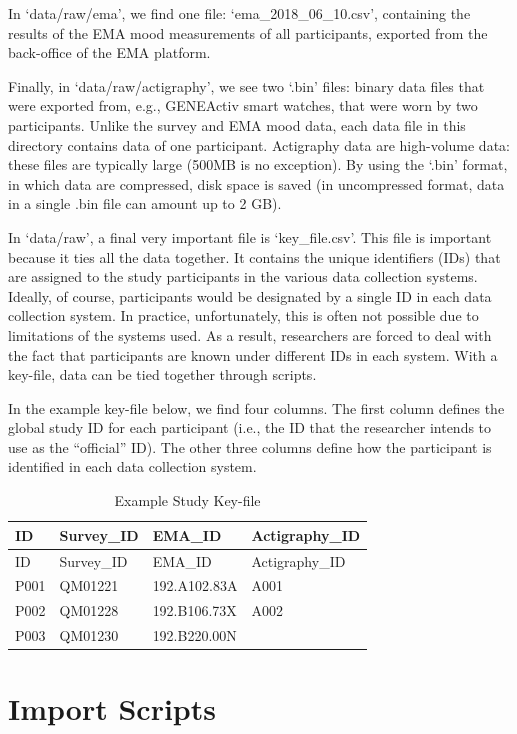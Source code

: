 \documentclass[]{book}
\begin{document}
In `data/raw/ema', we find one file: `ema\_2018\_06\_10.csv', containing
the results of the EMA mood measurements of all participants, exported
from the back-office of the EMA platform.

Finally, in `data/raw/actigraphy', we see two `.bin' files: binary data
files that were exported from, e.g., GENEActiv smart watches, that were
worn by two participants. Unlike the survey and EMA mood data, each data
file in this directory contains data of one participant. Actigraphy data
are high-volume data: these files are typically large (500MB is no
exception). By using the `.bin' format, in which data are compressed,
disk space is saved (in uncompressed format, data in a single .bin file
can amount up to 2 GB).

In `data/raw', a final very important file is `key\_file.csv'. This file
is important because it ties all the data together. It contains the
unique identifiers (IDs) that are assigned to the study participants in
the various data collection systems. Ideally, of course, participants
would be designated by a single ID in each data collection system. In
practice, unfortunately, this is often not possible due to limitations
of the systems used. As a result, researchers are forced to deal with
the fact that participants are known under different IDs in each system.
With a key-file, data can be tied together through scripts.

In the example key-file below, we find four columns. The first column
defines the global study ID for each participant (i.e., the ID that the
researcher intends to use as the ``official'' ID). The other three
columns define how the participant is identified in each data collection
system.

\begin{longtable}[]{@{}llll@{}}
\caption{\label{tab:tab5a} Example Study Key-file}\tabularnewline
\toprule
ID & Survey\_ID & EMA\_ID & Actigraphy\_ID\tabularnewline
\midrule
\endfirsthead
\toprule
ID & Survey\_ID & EMA\_ID & Actigraphy\_ID\tabularnewline
\midrule
\endhead
P001 & QM01221 & 192.A102.83A & A001\tabularnewline
P002 & QM01228 & 192.B106.73X & A002\tabularnewline
P003 & QM01230 & 192.B220.00N &\tabularnewline
\bottomrule
\end{longtable}

\section{Import Scripts}\label{import-scripts}
\end{document}
